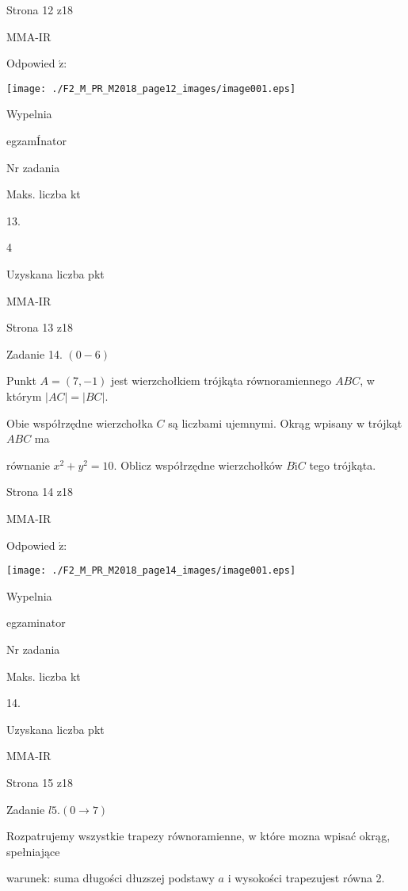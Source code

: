 \documentclass[a4paper,12pt]{article}
\begin{document}
Strona 12 z18

MMA-IR





Odpowied $\acute{\mathrm{z}}$:
\begin{center}
\texttt{[image: ./F2\_M\_PR\_M2018\_page12\_images/image001.eps]}
\end{center}
Wypelnia

egzamÍnator

Nr zadania

Maks. liczba kt

13.

4

Uzyskana liczba pkt

MMA-IR

Strona 13 z18





Zadanie 14. $(0-6)$

Punkt $A=(7,-1)$ jest wierzchołkiem trójkąta równoramiennego $ABC$, w którym $|AC|=|BC|.$

Obie współrzędne wierzchołka $C$ są liczbami ujemnymi. Okrąg wpisany w trójkąt $ABC$ ma

równanie $x^{2}+y^{2}=10$. Oblicz współrzędne wierzchołków $B\mathrm{i}C$ tego trójkąta.

Strona 14 z18

MMA-IR





Odpowied $\acute{\mathrm{z}}$:
\begin{center}
\texttt{[image: ./F2\_M\_PR\_M2018\_page14\_images/image001.eps]}
\end{center}
Wypelnia

egzaminator

Nr zadania

Maks. liczba kt

14.

Uzyskana liczba pkt

MMA-IR

Strona 15 z18





Zadanie $l5.(0\rightarrow 7)$

Rozpatrujemy wszystkie trapezy równoramienne, w które mozna wpisać okrąg, spełniające

warunek: suma długości dłuzszej podstawy $a$ i wysokości trapezujest równa 2.
\end{document}
